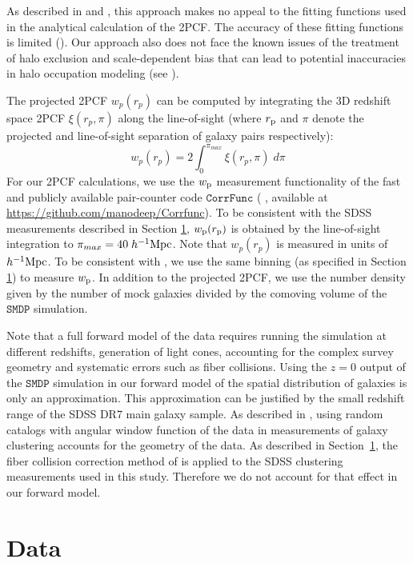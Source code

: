 \documentclass[12pt, preprint]{aastex}
\newcommand{\beq}{\begin{equation}}
\newcommand{\eeq}{\end{equation}}
\begin{document}
As described in \citet{decorated} and \citet{2016arXiv160701782H}, this approach makes no appeal to the fitting functions used in the analytical calculation of the 2PCF. The accuracy of these fitting functions is limited (\citealt{tinker08,tinker10,watson13}). Our approach also does not face the known issues of the treatment of halo exclusion and scale-dependent bias that can lead to potential inaccuracies in halo occupation modeling (see \citealt{vdb13}). 

The projected 2PCF $w_{p}(r_{p})$ can be computed by integrating the 3D redshift space 2PCF $\xi(r_{p} , \pi)$ along the line-of-sight (where $r_{\rm p}$ and $\pi$ denote the projected and line-of-sight separation of galaxy pairs respectively):
\beq
w_{p}(r_{p}) = 2 \int_{0}^{\pi_{max}}\xi(r_{p} , \pi)\; d\pi
\label{los}
\eeq
For our 2PCF calculations, we use the $w_{\rm p}$ measurement functionality of the fast and publicly available pair-counter code $\mathtt{CorrFunc}$ (\citealt{corrfunc} , available at \url{https://github.com/manodeep/Corrfunc}). To be consistent with the SDSS measurements described in Section \ref{sec:data}, $w_{\rm{p}}(r_{\rm{p}})$ is obtained by the line-of-sight integration to $\pi_{max}=40 \; h^{-1}\rm{Mpc}$. Note that $w_{p}(r_{p})$ is measured in units of $h^{-1}\rm{Mpc}$. To be consistent with \citet{guo2015}, we use the same binning (as specified in Section \ref{sec:data}) to measure $w_{\rm p}$. In addition to the projected 2PCF, we use the number density given by the number of mock galaxies divided by the comoving volume of the $\mathtt{SMDP}$ simulation. 

Note that a full forward model of the data requires running the simulation at different redshifts, generation of light cones, accounting for the complex survey geometry and systematic errors such as fiber collisions. Using the $z=0$ output of the $\mathtt{SMDP}$ simulation in our forward model of the spatial distribution of galaxies is only an approximation. This approximation can be justified by the small redshift range of the SDSS DR7 main galaxy sample. As described in \citealt{zehavi2011}, using random catalogs with angular window function of the data in measurements of galaxy clustering accounts for the geometry of the data. As described in Section~\ref{sec:data}, the fiber collision correction method of \citealt{guo2012} is applied to the SDSS clustering measurements used in this study. Therefore we do not account for that effect in our forward model.

\section{Data}\label{sec:data}
\end{document}

